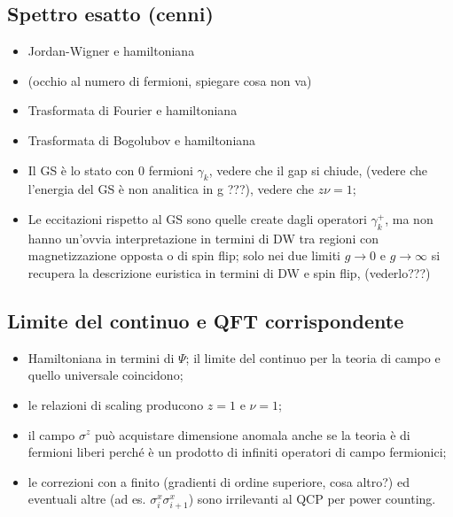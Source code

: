 \documentclass[a4paper,11pt]{article}
\newcommand{\ssubsection}[1]{\vspace{0.2cm} \subsection{#1}}
\begin{document}
\ssubsection{Spettro esatto (cenni)}
\begin{itemize}
 \item Jordan-Wigner e hamiltoniana
 \item (occhio al numero di fermioni, spiegare cosa non va)
 \item Trasformata di Fourier e hamiltoniana
 \item Trasformata di Bogolubov e hamiltoniana
 \item Il GS è lo stato con 0 fermioni $\gamma_k$, vedere che il gap si chiude, (vedere che l'energia del GS è non analitica in g ???), vedere che $z\nu=1$;
 \item Le eccitazioni rispetto al GS sono quelle create dagli operatori $\gamma_k^+$, ma non hanno un'ovvia interpretazione in termini di DW tra regioni con magnetizzazione opposta o di spin flip; solo nei due limiti $g\to 0$ e $g \to \infty$ si recupera la descrizione euristica in termini di DW e spin flip, (vederlo???) 
\end{itemize}

\ssubsection{Limite del continuo e QFT corrispondente}
\begin{itemize}
 \item Hamiltoniana in termini di $\Psi$; il limite del continuo per la teoria di campo e quello universale coincidono;
 \item le relazioni di scaling producono $z=1$ e $\nu=1$;
 \item il campo $\sigma^z$ può acquistare dimensione anomala anche se la teoria è di fermioni liberi perché è un prodotto di infiniti operatori di campo fermionici;
  \item le correzioni con a finito (gradienti di ordine superiore, cosa altro?) ed eventuali altre (ad es. $\sigma^x_i \sigma^x_{i+1}$) sono irrilevanti al QCP per power counting.
\end{itemize}
\end{document}
